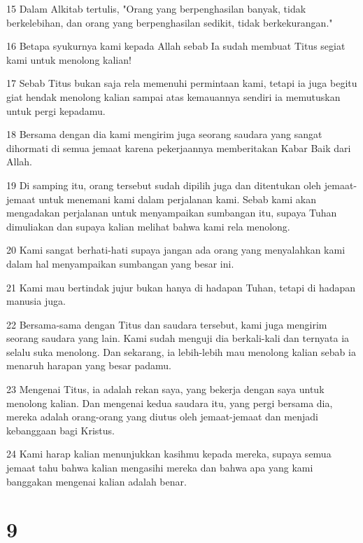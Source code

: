 \par 15 Dalam Alkitab tertulis, "Orang yang berpenghasilan banyak, tidak berkelebihan, dan orang yang berpenghasilan sedikit, tidak berkekurangan."
\par 16 Betapa syukurnya kami kepada Allah sebab Ia sudah membuat Titus segiat kami untuk menolong kalian!
\par 17 Sebab Titus bukan saja rela memenuhi permintaan kami, tetapi ia juga begitu giat hendak menolong kalian sampai atas kemauannya sendiri ia memutuskan untuk pergi kepadamu.
\par 18 Bersama dengan dia kami mengirim juga seorang saudara yang sangat dihormati di semua jemaat karena pekerjaannya memberitakan Kabar Baik dari Allah.
\par 19 Di samping itu, orang tersebut sudah dipilih juga dan ditentukan oleh jemaat-jemaat untuk menemani kami dalam perjalanan kami. Sebab kami akan mengadakan perjalanan untuk menyampaikan sumbangan itu, supaya Tuhan dimuliakan dan supaya kalian melihat bahwa kami rela menolong.
\par 20 Kami sangat berhati-hati supaya jangan ada orang yang menyalahkan kami dalam hal menyampaikan sumbangan yang besar ini.
\par 21 Kami mau bertindak jujur bukan hanya di hadapan Tuhan, tetapi di hadapan manusia juga.
\par 22 Bersama-sama dengan Titus dan saudara tersebut, kami juga mengirim seorang saudara yang lain. Kami sudah menguji dia berkali-kali dan ternyata ia selalu suka menolong. Dan sekarang, ia lebih-lebih mau menolong kalian sebab ia menaruh harapan yang besar padamu.
\par 23 Mengenai Titus, ia adalah rekan saya, yang bekerja dengan saya untuk menolong kalian. Dan mengenai kedua saudara itu, yang pergi bersama dia, mereka adalah orang-orang yang diutus oleh jemaat-jemaat dan menjadi kebanggaan bagi Kristus.
\par 24 Kami harap kalian menunjukkan kasihmu kepada mereka, supaya semua jemaat tahu bahwa kalian mengasihi mereka dan bahwa apa yang kami banggakan mengenai kalian adalah benar.

\chapter{9}

